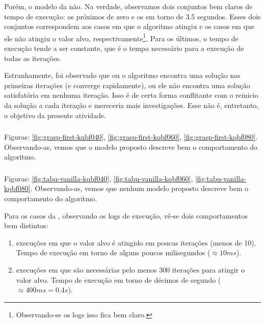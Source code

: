 Porém, o modelo da  não. Na verdade, observamos dois conjuntos bem claros de tempo de execução: os próximos de zero e os em torno de 3.5 segundos. Esses dois conjuntos correspondem aos casos em que o algoritmo atingiu e os casos em que ele não atingiu o valor alvo, respectivamente\footnote{Observando-se os logs isso fica bem claro.}. Para os últimos, o tempo de execução tende a ser constante, que é o tempo necessário para a execução de todas as iterações.

Estranhamente, foi observado que ou o algoritmo encontra uma solução nas primeiras iterações (e converge rapidamente), ou ele não encontra uma solução satisfatória em nenhuma iteração. Isso é de certa forma conflitante com o reinicio da solução a cada iteração e mereceria mais investigações. Esse não é, entretanto, o objetivo da presente atividade.

\subsubsection{\graspFirst}
\label{subsubsection:ttt-validation-grasp-first}

Figuras: \ref{fig:grasp-first-kqbf040}, \ref{fig:grasp-first-kqbf060},
\ref{fig:grasp-first-kqbf080}. Observando-as, vemos que o modelo proposto descreve bem o comportamento do algoritmo.

\subsubsection{\tabuVanilla}
\label{subsubsection:ttt-validation-tabu-vanilla}

Figuras: \ref{fig:tabu-vanilla-kqbf040}, \ref{fig:tabu-vanilla-kqbf060},
\ref{fig:tabu-vanilla-kqbf080}. Observando-as, vemos que nenhum modelo proposto descreve bem o comportamento do algoritmo.

Para os casos da , observando os logs de execução, vê-se dois comportamentos bem distintos:

\begin{enumerate}
    \item execuções em que o valor alvo é atingido em poucas iterações (menos de 10). Tempo de execução em torno de alguns poucos milisegundos ($\approx 10 ms$).
    \item execuções em que são necessárias pelo menos 300 iterações para atingir o valor alvo. Tempo de execução em torno de décimos de segundo ($\approx 400 ms = 0.4 s$).
\end{enumerate}

